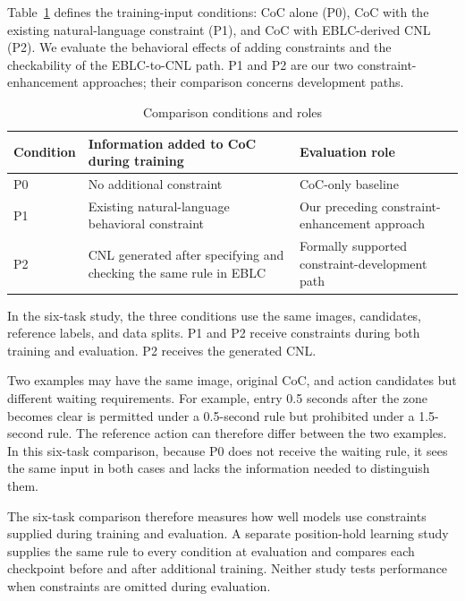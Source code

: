 \documentclass[nolineno]{ieeeaccess}
\begin{document}
Table~\ref{tab:comparison-conditions} defines the training-input conditions: CoC alone (P0), CoC with the existing natural-language constraint (P1), and CoC with EBLC-derived CNL (P2). We evaluate the behavioral effects of adding constraints and the checkability of the EBLC-to-CNL path. P1 and P2 are our two constraint-enhancement approaches; their comparison concerns development paths.\par
%
\begin{table}[tp]\caption{Comparison conditions and roles}\label{tab:comparison-conditions}
\centering\fontsize{8}{10}\selectfont\setlength{\tabcolsep}{3pt}
\begin{tabular}{@{}>{\raggedright\arraybackslash}p{}>{\raggedright\arraybackslash}p{}>{\raggedright\arraybackslash}p{}@{}}
\toprule
\textbf{Condition} & \textbf{Information added to CoC during training} & \textbf{Evaluation role}\\
\midrule
P0 & No additional constraint & CoC-only baseline\\[3pt]
P1 & Existing natural-language behavioral constraint & Our preceding constraint-enhancement approach\\[3pt]
P2 & CNL generated after specifying and checking the same rule in EBLC & Formally supported constraint-development path\\[3pt]
\bottomrule\end{tabular}
\end{table}
%
In the six-task study, the three conditions use the same images, candidates, reference labels, and data splits. P1 and P2 receive constraints during both training and evaluation. P2 receives the generated CNL. \par
%
Two examples may have the same image, original CoC, and action candidates but different waiting requirements. For example, entry 0.5 seconds after the zone becomes clear is permitted under a 0.5-second rule but prohibited under a 1.5-second rule. The reference action can therefore differ between the two examples. In this six-task comparison, because P0 does not receive the waiting rule, it sees the same input in both cases and lacks the information needed to distinguish them.\par

The six-task comparison therefore measures how well models use constraints supplied during training and evaluation. A separate position-hold learning study supplies the same rule to every condition at evaluation and compares each checkpoint before and after additional training. Neither study tests performance when constraints are omitted during evaluation.\par
\end{document}
